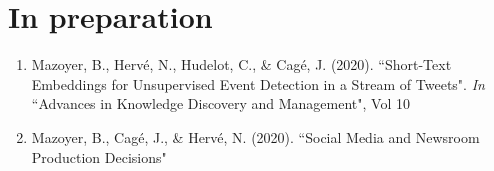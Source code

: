 \section*{In preparation}
\begin{enumerate}
    \item Mazoyer, B., Hervé, N., Hudelot, C., \& Cagé, J. (2020). ``Short-Text Embeddings for Unsupervised Event Detection in a Stream of Tweets". \textit{In} ``Advances in Knowledge Discovery and Management", Vol 10 
    
    \item Mazoyer, B., Cagé, J., \& Hervé, N. (2020). ``Social Media and Newsroom Production Decisions"\\
\end{enumerate}
